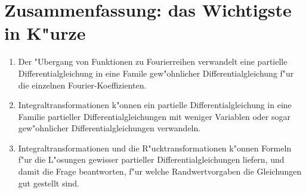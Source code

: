 \section{Zusammenfassung: das Wichtigste in K"urze}
\begin{enumerate}
\item Der "Ubergang von Funktionen zu Fourierreihen verwandelt
eine partielle Differentialgleichung in eine Famile gew"ohnlicher
Differentialgleichung f"ur die einzelnen Fourier-Koeffizienten.
\item Integraltransformationen k"onnen ein partielle Differentialgleichung
in eine Familie partieller Differentialgleichungen mit weniger Variablen
oder sogar gew"ohnlicher Differentialgleichungen verwandeln.
\item Integraltransformationen und die R"ucktransformationen k"onnen
Formeln f"ur die L"osungen gewisser partieller Differentialgleichungen
liefern, und damit die Frage beantworten, f"ur welche Randwertvorgaben
die Gleichungen gut gestellt sind.
\end{enumerate}
